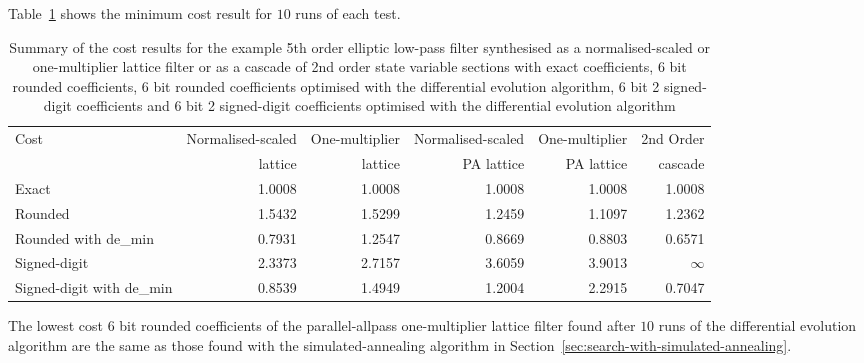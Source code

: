 \documentclass[a4paper,twoside,10pt,english]{report}
\begin{document}
Table~\ref{tab:de_min-algorithm-cost-summary} shows the minimum cost result for
$10$ runs of each test. 
\begin{table}[!hb]
\centering
\begin{threeparttable}
\begin{tabular}{lrrrrr} \toprule
Cost&Normalised-scaled&One-multiplier&Normalised-scaled&One-multiplier&2nd Order\\
&lattice&lattice&PA lattice&PA lattice& cascade\\
\midrule
Exact                     & 1.0008 & 1.0008 & 1.0008 & 1.0008 & 1.0008 \\
Rounded                   & 1.5432 & 1.5299 & 1.2459 & 1.1097 & 1.2362 \\
Rounded with de\_min      & 0.7931 & 1.2547 & 0.8669 & 0.8803 & 0.6571 \\
Signed-digit              & 2.3373 & 2.7157 & 3.6059 & 3.9013 & $\infty$ \\
Signed-digit with de\_min & 0.8539 & 1.4949 & 1.2004 & 2.2915 & 0.7047 \\ 
\bottomrule
\end{tabular}
\end{threeparttable}
\caption[Summary of cost results for each differential evolution algorithm example]
{Summary of the cost results for the example 5th order elliptic low-pass filter
synthesised as a normalised-scaled or one-multiplier lattice filter or as 
a cascade of 2nd order state variable sections with exact coefficients, 6 bit 
rounded coefficients, 6 bit rounded coefficients optimised with the differential
evolution algorithm, 6 bit 2 signed-digit coefficients and 6 bit 2 signed-digit
coefficients optimised with the differential evolution algorithm}
\label{tab:de_min-algorithm-cost-summary}
\end{table}

The lowest cost 6 bit rounded coefficients of the parallel-allpass
one-multiplier lattice filter found after $10$ runs of the differential 
evolution algorithm are the same as those found with the simulated-annealing 
algorithm in Section~\ref{sec:search-with-simulated-annealing}.
\end{document}
